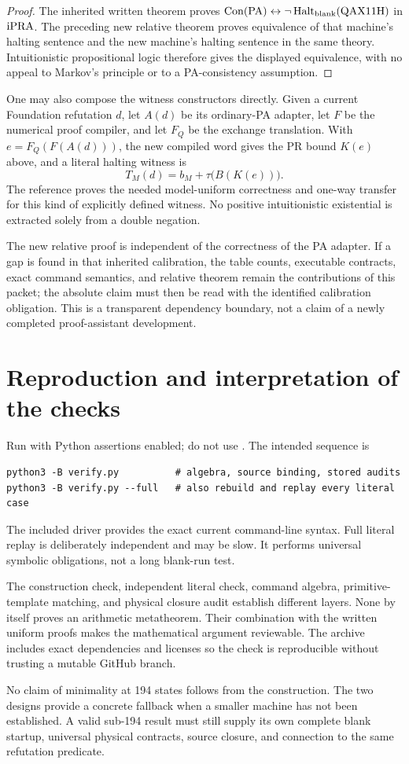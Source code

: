\begin{proof}
The inherited written theorem proves
$\operatorname{Con}(\mathrm{PA})\leftrightarrow\neg\operatorname{Halt}_{\rm blank}(\mathrm{QAX11H})$
in $\mathrm{iPRA}$. The preceding new relative theorem proves equivalence
of that machine's halting sentence and the new machine's halting
sentence in the same theory. Intuitionistic propositional logic
therefore gives the displayed equivalence, with no appeal to
Markov's principle or to a PA-consistency assumption.
\end{proof}

One may also compose the witness constructors directly. Given a
current Foundation refutation $d$, let $A(d)$ be its ordinary-PA
adapter, let $F$ be the numerical proof compiler, and let $F_Q$ be
the exchange translation. With $e=F_Q(F(A(d)))$, the new compiled
word gives the PR bound $K(e)$ above, and a literal halting witness is
\[
 T_M(d)=b_M+\tau\bigl(B(K(e))\bigr).
\]
The reference proves the needed model-uniform correctness and
one-way transfer for this kind of explicitly defined witness.
No positive intuitionistic existential is extracted solely from a
double negation.

The new relative proof is independent of the correctness of the
PA adapter. If a gap is found in that inherited calibration, the
table counts, executable contracts, exact command semantics, and
relative theorem remain the contributions of this packet; the
absolute claim must then be read with the identified calibration
obligation. This is a transparent dependency boundary, not a claim
of a newly completed proof-assistant development.

\section{Reproduction and interpretation of the checks}

Run with Python assertions enabled; do not use .
The intended sequence is
\begin{verbatim}
python3 -B verify.py          # algebra, source binding, stored audits
python3 -B verify.py --full   # also rebuild and replay every literal case
\end{verbatim}
The included driver provides the exact current command-line syntax.
Full literal replay is deliberately independent and may be slow.
It performs universal symbolic obligations, not a long blank-run
test.

The construction check, independent literal check, command algebra,
primitive-template matching, and physical closure audit establish
different layers. None by itself proves an arithmetic metatheorem.
Their combination with the written uniform proofs makes the
mathematical argument reviewable. The archive includes exact
dependencies and licenses so the check is reproducible without
trusting a mutable GitHub branch.

No claim of minimality at 194 states follows from the construction.
The two designs provide a concrete fallback when a smaller machine
has not been established. A valid sub-194 result must still supply
its own complete blank startup, universal physical contracts, source
closure, and connection to the same refutation predicate.


